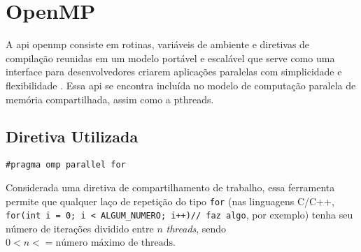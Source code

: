 \section{OpenMP}

\label{sec:openmp}

A \acrshort{api} \acrfull{openmp} consiste em rotinas, 
variáveis de ambiente e diretivas de compilação reunidas em um 
modelo portável e escalável que serve como uma interface para 
desenvolvedores criarem aplicações paralelas com simplicidade e 
flexibilidade \cite{wiki:openmp}. Essa \acrshort{api} se encontra 
incluída no modelo de computação paralela de memória compartilhada, 
assim como a \acrshort{pthreads}.

\subsection{Diretiva Utilizada}
\begin{lstlisting}
#pragma omp parallel for
\end{lstlisting}
Considerada uma diretiva de compartilhamento de trabalho, essa 
ferramenta permite que qualquer laço de repetição do tipo \texttt{for} 
(nas linguagens C/C++, 
\lstinline[columns=fixed]{for(int i = 0; i < ALGUM_NUMERO; i++)// faz algo}, 
por exemplo) tenha seu número de iterações dividido entre $n$ \textit{\gls{threads}}, 
sendo $0 < n <= \text{número máximo de threads}$.